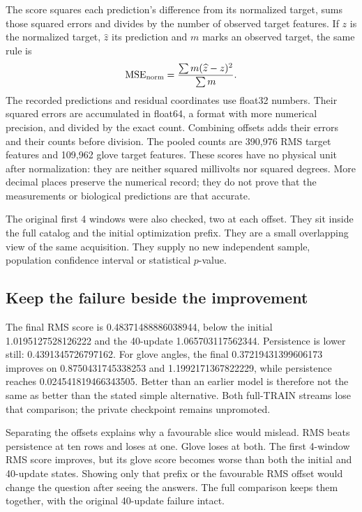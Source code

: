 The score squares each prediction's difference from its normalized target, sums those squared errors and divides by the number of observed target features. If $z$ is the normalized target, $\widehat z$ its prediction and $m$ marks an observed target, the same rule is
\[
 \operatorname{MSE}_{\rm norm}=\frac{\sum m(\widehat z-z)^2}{\sum m}.
\]
The recorded predictions and residual coordinates use float32 numbers. Their squared errors are accumulated in float64, a format with more numerical precision, and divided by the exact count. Combining offsets adds their errors and their counts before division. The pooled counts are 390,976 RMS target features and 109,962 glove target features. These scores have no physical unit after normalization: they are neither squared millivolts nor squared degrees. More decimal places preserve the numerical record; they do not prove that the measurements or biological predictions are that accurate.

The original first 4 windows were also checked, two at each offset. They sit inside the full catalog and the initial optimization prefix. They are a small overlapping view of the same acquisition. They supply no new independent sample, population confidence interval or statistical $p$-value.



\subsection{Keep the failure beside the improvement}
The final RMS score is 0.48371488886038944, below the initial 1.0195127528126222 and the 40-update 1.065703117562344. Persistence is lower still: 0.4391345726797162. For glove angles, the final 0.37219431399606173 improves on 0.8750431745338253 and 1.1992171367822229, while persistence reaches 0.024541819466343505. Better than an earlier model is therefore not the same as better than the stated simple alternative. Both full-TRAIN streams lose that comparison; the private checkpoint remains unpromoted.

Separating the offsets explains why a favourable slice would mislead. RMS beats persistence at ten rows and loses at one. Glove loses at both. The first 4-window RMS score improves, but its glove score becomes worse than both the initial and 40-update states. Showing only that prefix or the favourable RMS offset would change the question after seeing the answers. The full comparison keeps them together, with the original 40-update failure intact.

